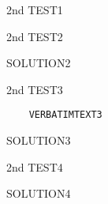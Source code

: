 \begin{problem}
  2nd TEST1
\end{problem}
\begin{problem}
  2nd TEST2
\end{problem}
\begin{solution}
SOLUTION2
\end{solution}

\begin{problem}
  2nd TEST3
  \begin{verbatim}
    VERBATIMTEXT3
  \end{verbatim}
\begin{solution}
SOLUTION3
\end{solution}
\end{problem}
\begin{problem}
  2nd TEST4
\end{problem}
\begin{solution}
SOLUTION4
\end{solution}
